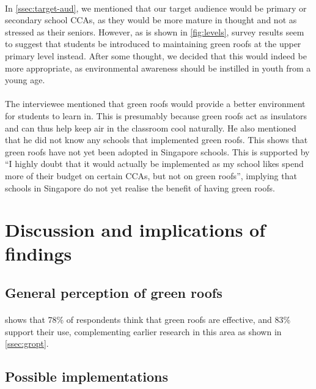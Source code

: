 \documentclass[a4paper]{article}
\begin{document}
\begin{multicols}{2}
  \paragraph{} In \cref{ssec:target-aud}, we mentioned that our target
  audience would be primary or secondary school CCAs, as they would be
  more mature in thought and not as stressed as their seniors. However,
  as is shown in \cref{fig:levels}, survey results seem to suggest that
  students be introduced to maintaining green roofs at the upper primary
  level instead. After some thought, we decided that this would indeed
  be more appropriate, as environmental awareness should be instilled
  in youth from a young age.

  \paragraph{} The interviewee mentioned that green roofs would provide
  a better environment for students to learn in. This is presumably
  because green roofs act as insulators and can thus help keep air in the
  classroom cool naturally. He also mentioned that he did not know any
  schools that implemented green roofs. This shows that green roofs have
  not yet been adopted in Singapore schools. This is supported by ``I
  highly doubt that it would actually be implemented as my school likes
  spend more of their budget on certain CCAs, but not on green roofs'',
  implying that schools in Singapore do not yet realise the benefit of
  having green roofs.



  \section{Discussion and implications of findings}
  \subsection{General perception of green roofs}
  \paragraph{}  shows that 78\% of respondents
  think that green roofs are effective, and 83\% support their
  use, complementing earlier research in this area as shown in
  \cref{ssec:gropt}.


  \subsection{Possible implementations}

\end{multicols}
\end{document}

